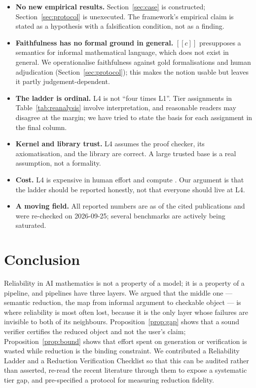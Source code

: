 \documentclass[11pt,a4paper]{article}
\theoremstyle{plain}
\theoremstyle{remark}
\newcommand{\sem}[1]{\ensuremath{[\![#1]\!]}}   %
\begin{document}
\begin{itemize}[leftmargin=2.2em]
  \item \textbf{No new empirical results.}  Section~\ref{sec:case} is
        constructed; Section~\ref{sec:protocol} is unexecuted.  The framework's
        empirical claim is stated as a hypothesis with a falsification
        condition, not as a finding.
  \item \textbf{Faithfulness has no formal ground in general.}  $\sem{c}$
        presupposes a semantics for informal mathematical language, which does
        not exist in general.  We operationalise faithfulness against gold
        formalisations and human adjudication
        (Section~\ref{sec:protocol}); this makes the notion usable but leaves it
        partly judgement-dependent.
  \item \textbf{The ladder is ordinal.}  L4 is not ``four times L1''.  Tier
        assignments in Table~\ref{tab:reanalysis} involve interpretation, and
        reasonable readers may disagree at the margin; we have tried to state
        the basis for each assignment in the final column.
  \item \textbf{Kernel and library trust.}  L4 assumes the proof checker, its
        axiomatisation, and the library are correct.  A large trusted base
        \cite{mathlib2020} is a real assumption, not a formality.
  \item \textbf{Cost.}  L4 is expensive in human effort and compute
        \cite{hubert2025alphaproof}.  Our argument is that the ladder should be
        reported honestly, not that everyone should live at L4.
  \item \textbf{A moving field.}  All reported numbers are as of the cited
        publications and were re-checked on 2026-09-25; several benchmarks are
        actively being saturated.
\end{itemize}

\section{Conclusion}
\label{sec:conclusion}

Reliability in AI mathematics is not a property of a model; it is a property of
a pipeline, and pipelines have three layers.  We argued that the middle one ---
semantic reduction, the map from informal argument to checkable object --- is
where reliability is most often lost, because it is the only layer whose
failures are invisible to both of its neighbours.  Proposition~\ref{prop:gap}
shows that a sound verifier certifies the reduced object and not the user's
claim; Proposition~\ref{prop:bound} shows that effort spent on generation or
verification is wasted while reduction is the binding constraint.  We
contributed a Reliability Ladder and a Reduction Verification Checklist so that
this can be audited rather than asserted, re-read the recent literature through
them to expose a systematic tier gap, and pre-specified a protocol for
measuring reduction fidelity.
\end{document}
